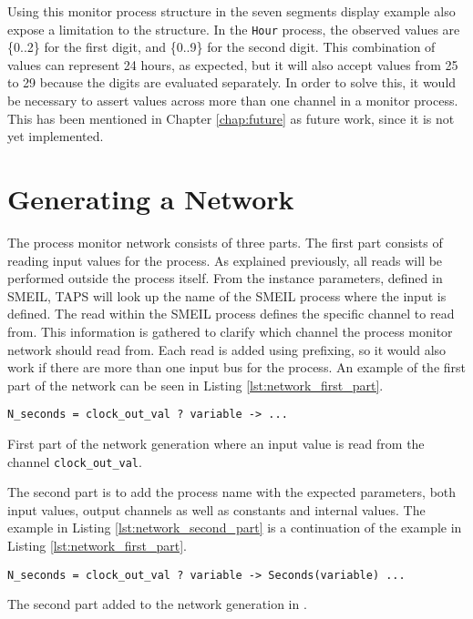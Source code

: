 Using this monitor process structure in the seven segments display example also expose a limitation to the structure. In the \texttt{Hour} process, the observed values are \{0..2\} for the first digit, and \{0..9\} for the second digit. This combination of values can represent 24 hours, as expected, but it will also accept values from 25 to 29 because the digits are evaluated separately. In order to solve this, it would be necessary to assert values across more than one channel in a monitor process. This has been mentioned in Chapter \ref{chap:future} as future work, since it is not yet implemented.
\section{Generating a \cspm{} Network}
The process monitor network consists of three parts. The first part consists of reading input values for the process. As explained previously, all reads will be performed outside the process itself. From the instance parameters, defined in SMEIL, TAPS will look up the name of the SMEIL process where the input is defined. The read within the SMEIL process defines the specific channel to read from. This information is gathered to clarify which \cspm{} channel the process monitor network should read from. Each read is added using prefixing, so it would also work if there are more than one input bus for the process. An example of the first part of the network can be seen in Listing \ref{lst:network_first_part}.
\begin{listing}
\begin{verbatim}
N_seconds = clock_out_val ? variable -> ...
\end{verbatim}
\caption{First part of the network generation where an input value is read from the channel \texttt{clock\_out\_val}.}
\label{lst:network_first_part}
\end{listing}
The second part is to add the process name with the expected parameters, both input values, output channels as well as constants and internal values. The example in Listing \ref{lst:network_second_part} is a continuation of the example in Listing \ref{lst:network_first_part}.
\begin{listing}
\begin{verbatim}
N_seconds = clock_out_val ? variable -> Seconds(variable) ...
\end{verbatim}
\caption{The second part added to the network generation in \cspm{}.}
\label{lst:network_second_part}
\end{listing}

